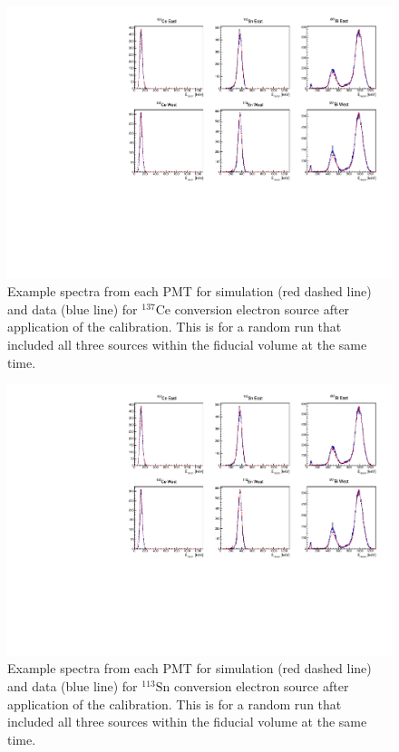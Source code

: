 \begin{figure}
  \centering
  \includegraphics[scale=1,page=2]{4-UCNACalibrations/run_17523.pdf}
  \caption{Example spectra from each PMT for simulation (red dashed line) and data (blue line) for $^{137}\mathrm{Ce}$ conversion electron source
    after application of the calibration. This is for a random run that included all three sources within the fiducial
    volume at the same time.}
  \label{fig:Ce_spectra}
\end{figure}

\begin{figure}
  \centering
  \includegraphics[scale=1,page=3]{4-UCNACalibrations/run_17523.pdf}
  \caption{Example spectra from each PMT for simulation (red dashed line) and data (blue line) for $^{113}\mathrm{Sn}$ conversion electron source
    after application of the calibration. This is for a random run that included all three sources within the fiducial
    volume at the same time.}
  \label{fig:Sn_spectra}
\end{figure}

